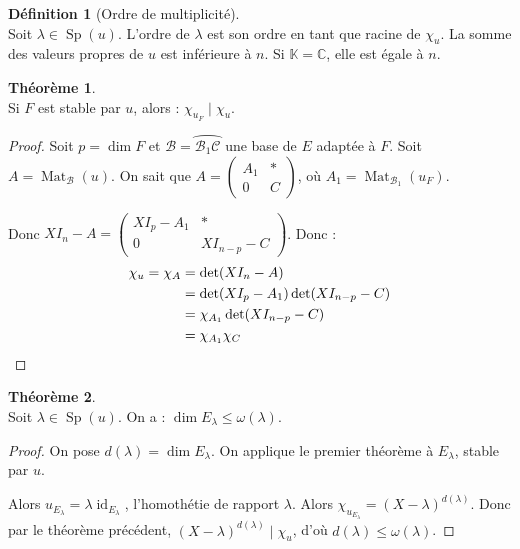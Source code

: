 \documentclass[12pt]{book}
\let\ensembleNombre\mathbb
\newcommand*\C{\ensuremath{\ensembleNombre{C}}}
\newcommand*\K{\ensuremath{\ensembleNombre{K}}}
\DeclareMathOperator{\id}{id}
\DeclareMathOperator{\Sp}{Sp}
\DeclareMathOperator{\Mat}{Mat}
\theoremstyle{definition}
\newtheorem*{defi}{Définition}
\newtheorem{thme}{Théorème}[chapter]
\theoremstyle{remark}
\newenvironment{fdef}
  {\begin{mdframed}[roundcorner=10pt, linewidth=1pt]\begin{defi}}
  {\end{defi}\end{mdframed}}
\newenvironment{fthme}
  {\begin{mdframed}[roundcorner=10pt, linewidth=2pt]\begin{thme}}
  {\end{thme}\end{mdframed}}
\begin{document}
	\begin{fdef}[Ordre de multiplicité] \mbox{~}\\
	Soit $\lambda \in \Sp(u)$. L'ordre de $\lambda$ est son ordre en tant que racine de $\chi_u$. La somme des valeurs propres de $u$ est inférieure à $n$. Si $\K = \C$, elle est égale à $n$.
	\end{fdef}
	
	\begin{fthme}\mbox{~}\\
	Si $F$ est stable par $u$, alors : $\boxed{ \chi_{u_F} \;|\; \chi_u .}$
	\end{fthme}
	\begin{proof}
	Soit $p = \dim F$ et $\mathcal B = \wideparen{\mathcal B_1 \mathcal C}$ une base de $E$ adaptée à $F$. Soit $A = \Mat_{\mathcal B}(u)$. On sait que $A = \begin{pmatrix} A_1 & * \\ 0 & C \end{pmatrix}$, où $A_1 = \Mat_{\mathcal B_1}(u_F)$.
	
	Donc $XI_n - A = \begin{pmatrix} XI_p - A_1 & * \\ 0 & XI_{n-p} - C \end{pmatrix}$. Donc :
	\begin{align*}
	\chi_u = \chi_A &= \det(XI_n - A) \\
	&= \det(XI_p - A_1) \det(XI_{n-p} - C) \\
	&= \chi_{A_1} \det (XI_{n-p} - C) \\
	&= \chi_{A_1}\chi_C \qedhere
	\end{align*}
	\end{proof}
	
	\begin{fthme}\mbox{~}\\
	Soit $\lambda \in \Sp(u)$. On a : $\boxed{ \dim E_\lambda \leq \omega(\lambda).}$
	\end{fthme}
	
	\begin{proof}
	On pose $d(\lambda) = \dim E_\lambda$. On applique le premier théorème à $E_\lambda$, stable par $u$.
	
	Alors $u_{E_\lambda} = \lambda \id_{E_\lambda}$, l'homothétie de rapport $\lambda$. Alors $\chi_{u_{E_\lambda}} = (X - \lambda)^{d(\lambda)}$. Donc par le théorème précédent, $(X - \lambda)^{d(\lambda)} \; | \; \chi_u$, d'où $d(\lambda) \leq \omega(\lambda)$.
	\end{proof}		
	
\end{document}

